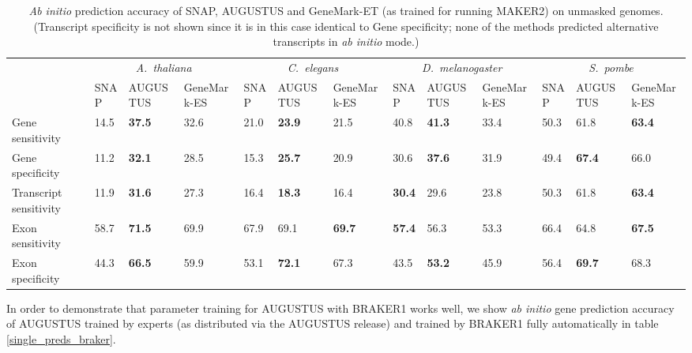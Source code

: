 \documentclass[a4paper,10pt]{report}
\begin{document}
\begin{table}
\caption{\textit{Ab initio} prediction accuracy of SNAP, AUGUSTUS and GeneMark-ET (as trained for running MAKER2) on unmasked genomes. (Transcript specificity is not shown since it is in this case identical to Gene specificity; none of the methods predicted alternative transcripts in \textit{ab initio} mode.) \label{single_preds_maker}}
\begin{tabular}{|l|p{1.5cm}p{1.2cm}p{1.2cm}|p{1.2cm}p{1.2cm}p{1.2cm}|p{1.2cm}p{1.2cm}p{1.2cm}|p{1.2cm}p{1.2cm}p{1.2cm}|}\hline
 & \multicolumn{3}{c}{\textit{A.~thaliana}} &  \multicolumn{3}{|c|}{\textit{C.~elegans}} &  \multicolumn{3}{|c|}{\textit{D.~melanogaster}} &  \multicolumn{3}{|c|}{\textit{S.~pombe}}\\
 & \tiny{SNAP} & \tiny{AUGUSTUS} & \tiny{GeneMark-ES} & \tiny{SNAP} & \tiny{AUGUSTUS} &  \tiny{GeneMark-ES} & \tiny{SNAP} & \tiny{AUGUSTUS} &\tiny{GeneMark-ES} & \tiny{SNAP} & \tiny{AUGUSTUS} & \tiny{GeneMark-ES}\\
 \hline
Gene sensitivity        & 14.5 & \textbf{37.5} & 32.6 & 21.0 & \textbf{23.9} & 21.5 & 40.8 & \textbf{41.3} & 33.4 & 50.3 & 61.8 & \textbf{63.4}\\
Gene specificity        & 11.2 & \textbf{32.1} & 28.5 & 15.3 & \textbf{25.7} & 20.9 & 30.6 & \textbf{37.6} & 31.9 & 49.4 & \textbf{67.4} & 66.0\\
Transcript sensitivity  & 11.9 & \textbf{31.6} & 27.3 & 16.4 & \textbf{18.3} & 16.4 & \textbf{30.4} & 29.6 & 23.8 & 50.3 & 61.8 & \textbf{63.4}\\
Exon sensitivity        & 58.7 & \textbf{71.5} & 69.9 & 67.9 & 69.1 & \textbf{69.7} & \textbf{57.4} & 56.3 & 53.3 & 66.4 & 64.8 & \textbf{67.5}\\
Exon specificity        & 44.3 & \textbf{66.5} & 59.9 & 53.1 & \textbf{72.1} & 67.3 & 43.5 & \textbf{53.2} & 45.9 & 56.4 & \textbf{69.7} & 68.3\\
\hline
\end{tabular}
\end{table}

In order to demonstrate that parameter training for AUGUSTUS with BRAKER1 works well, we show \textit{ab initio} gene prediction accuracy of AUGUSTUS trained by experts (as distributed via the AUGUSTUS release) and trained by BRAKER1 fully automatically in table \ref{single_preds_braker}.
\end{document}
